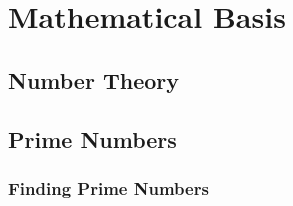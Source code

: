 
\chapter{Mathematical Basis}
\label{Chapter2}


\section{Number Theory}



\section{Prime Numbers}

\subsection{Finding Prime Numbers}

